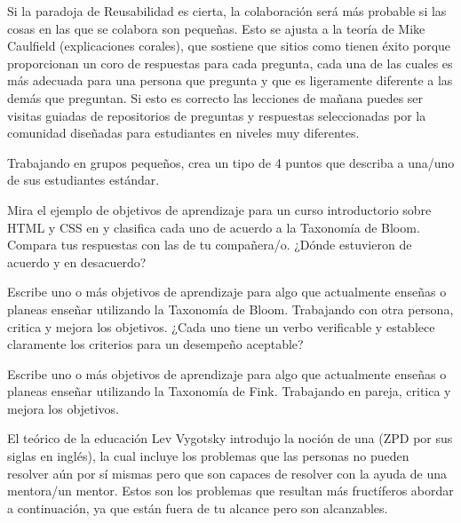 Si la paradoja de Reusabilidad es cierta,
la colaboración será más probable
si las cosas en las que se colabora son pequeñas.
Esto se ajusta a la teoría de Mike Caulfield 
(explicaciones corales),
que sostiene que sitios como
 tienen éxito porque
proporcionan un coro de respuestas para cada pregunta,
cada una de las cuales es más adecuada para
una persona que pregunta y que es ligeramente diferente a las demás que preguntan.
Si esto es correcto
las lecciones de mañana puedes ser visitas guiadas de repositorios
de preguntas y respuestas seleccionadas por la comunidad
diseñadas para estudiantes en niveles muy diferentes.
 
 
 
 
Trabajando en grupos pequeños,
crea un tipo de 4 puntos que describa a una/uno de sus estudiantes estándar.
 
 
Mira el ejemplo de objetivos de aprendizaje
para un curso introductorio sobre HTML y CSS
en 
y clasifica cada uno de acuerdo a la Taxonomía de Bloom.
Compara tus respuestas con las de tu compañera/o.
¿Dónde estuvieron de acuerdo y en desacuerdo?
 
 
Escribe uno o más objetivos de aprendizaje
para algo que actualmente enseñas o planeas enseñar
utilizando la Taxonomía de Bloom.
Trabajando con otra persona,
critica y mejora los objetivos.
¿Cada uno tiene un verbo verificable y establece claramente
los criterios  para un desempeño aceptable?
 
 
Escribe uno o más objetivos de aprendizaje
para algo que actualmente enseñas o planeas enseñar
utilizando la Taxonomía de Fink.
Trabajando en pareja,
critica y mejora los objetivos.
 
 
El teórico de la educación Lev Vygotsky introdujo la noción de una
 (ZPD por sus siglas en inglés),
la cual incluye los problemas que las personas no pueden resolver aún por sí mismas
pero que son capaces de resolver con la ayuda de una mentora/un mentor.
Estos son los problemas que resultan más fructíferos abordar a continuación,
ya que están fuera de tu alcance pero son alcanzables.
 
